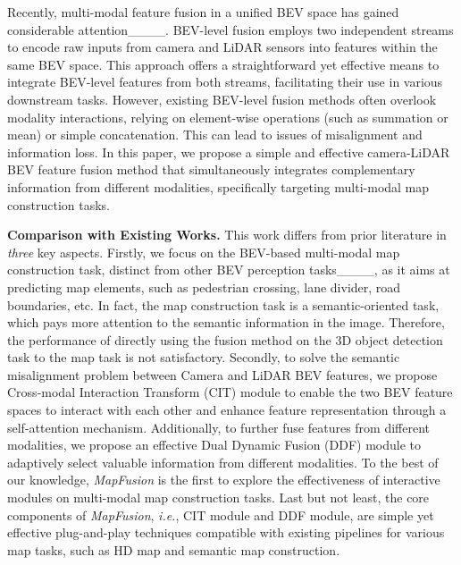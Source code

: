 Recently, multi-modal feature fusion in a unified BEV space has gained considerable attention____. BEV-level fusion employs two independent streams to encode raw inputs from camera and LiDAR sensors into features within the same BEV space. This approach offers a straightforward yet effective means to integrate BEV-level features from both streams, facilitating their use in various downstream tasks.
However, existing BEV-level fusion methods often overlook modality interactions, relying on element-wise operations (such as summation or mean) or simple concatenation. This can lead to issues of misalignment and information loss. In this paper, we propose a simple and effective camera-LiDAR BEV feature fusion method that simultaneously integrates complementary information from different modalities, specifically targeting multi-modal map construction tasks.





\noindent\textbf{Comparison with Existing Works.}
This work differs from prior literature in \textit{three} key aspects. 
Firstly, we focus on the BEV-based multi-modal map construction task, distinct from other BEV perception tasks____, as it aims at predicting map elements, such as pedestrian crossing, lane divider, road boundaries, etc. 
In fact, the map construction task is a semantic-oriented task, which pays more attention to the semantic information in the image.
Therefore, the performance of directly using the fusion method on the 3D object detection task to the map task is not satisfactory.
Secondly, to solve the semantic misalignment problem between Camera and LiDAR BEV features, we propose Cross-modal Interaction Transform (CIT) module to enable the two BEV feature spaces to interact with each other and enhance feature representation through a self-attention mechanism.
Additionally, to further fuse features from different modalities, we propose an effective Dual Dynamic Fusion (DDF) module to adaptively select valuable information from different modalities.
To the best of our knowledge, \textit{MapFusion} is the first to explore the effectiveness of interactive modules on multi-modal map construction tasks.
Last but not least, the core components of \textit{MapFusion}, \textit{i.e.}, CIT module and DDF module, are simple yet effective plug-and-play techniques compatible with existing pipelines for various map tasks, such as HD map and semantic map construction.